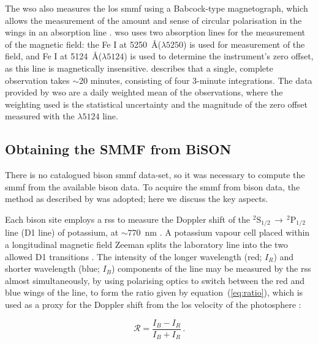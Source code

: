 The \gls{wso} also measures the \gls{los} \gls{smmf} using a Babcock-type magnetograph, which allows the measurement of the amount and sense of circular polarisation in the wings in an absorption line \citep{scherrer_mean_1977}. \gls{wso} uses two absorption lines for the measurement of the magnetic field: the Fe I at 5250~\AA ($\lambda 5250$) is used for measurement of the field, and Fe I at 5124~\AA ($\lambda 5124$) is used to determine the instrument's zero offset, as this line is magnetically insensitive. \cite{scherrer_mean_1977} describes that a single, complete observation takes $\sim$20 minutes, consisting of four 3-minute integrations. The data provided by \gls{wso} are a daily weighted mean of the observations, where the weighting used is the statistical uncertainty and the magnitude of the zero offset measured with the $\lambda 5124$ line.


\subsection{Obtaining the SMMF from BiSON}

There is no catalogued \gls{bison} \gls{smmf} data-set, so it was necessary to compute the \gls{smmf} from the available \gls{bison} data. To acquire the \gls{smmf} from \gls{bison} data, the method as described by \citet{chaplin_studies_2003} was adopted; here we discuss the key aspects.

Each \gls{bison} site employs a \gls{rss} to measure the Doppler shift of the $^{2}\mathrm{S}_{1/2} \, \rightarrow \, ^{2}\mathrm{P}_{1/2}$ line (D1 line) of potassium, at $\sim 770$~nm \citep{brookes_resonant-scattering_1978}. A potassium vapour cell placed within a longitudinal magnetic field Zeeman splits the laboratory line into the two allowed D1 transitions \citep{lund_spatial_2017}. The intensity of the longer wavelength (red; $I_R$) and shorter wavelength (blue; $I_B$) components of the line may be measured by the \gls{rss} almost simultaneously, by using polarising optics to switch between the red and blue wings of the line, to form the ratio given by equation~(\ref{eq:ratio}), which is used as a proxy for the Doppler shift from the \gls{los} velocity of the photosphere \citep[see:][]{brookes_observation_1976, brookes_resonant-scattering_1978, elsworth_performance_1995, chaplin_studies_2003, lund_spatial_2017}: 

\begin{equation}
\mathcal{R} = \frac{I_B - I_R}{I_B + I_R} \, .
\label{eq:ratio}
\end{equation}

